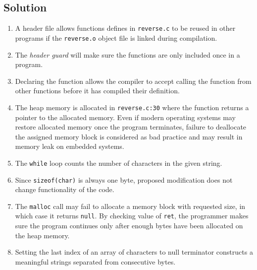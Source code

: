 
\subsection*{Solution}

\begin{enumerate}
\item
A header file allows functions defines in \texttt{reverse.c} to be reused in other programs if the \texttt{reverse.o} object file is linked during compilation.

\item
The \textit{header guard} will make sure the functions are only included once in a program.

\item
Declaring the function allows the compiler to accept calling the function from other functions before it has compiled their definition.

\item
The heap memory is allocated in \texttt{reverse.c:30} where the function returns a pointer to the allocated memory.
Even if modern operating systems may restore allocated memory once the program terminates, failure to deallocate the assigned memory block is considered as bad practice and may result in memory leak on embedded systems.

\item
The \texttt{while} loop counts the number of characters in the given string.

\item
Since \texttt{sizeof(char)} is always one byte, proposed modification does not change functionality of the code.

\item
The \texttt{malloc} call may fail to allocate a memory block with requested size, in which case it returns \texttt{null}.
By checking value of \texttt{ret}, the programmer makes sure the program continues only after enough bytes have been allocated on the heap memory.

\item
Setting the last index of an array of characters to null terminator constructs a meaningful strings separated from consecutive bytes.

\end{enumerate}
